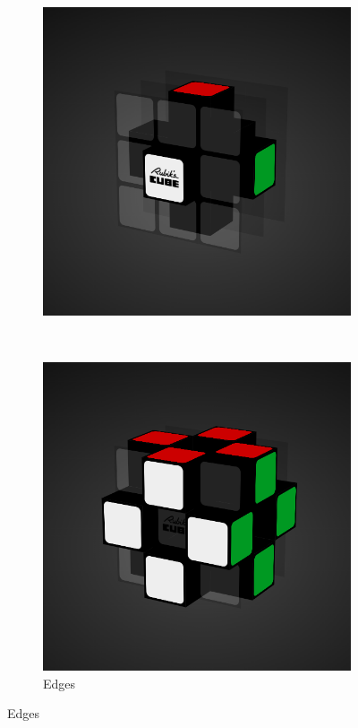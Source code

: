 \begin{figure}[h]
\begin{subfigure}{0.5\textwidth}
        \includegraphics[width=.90\linewidth]{Figures/2 Background/anatomy-centers.png}
    \end{subfigure}\\
    \vspace{2mm}
    \begin{subfigure}{0.5\textwidth}
        \centering
        \caption{Edges}
        \label{fig:anatomy-edges}
        \includegraphics[width=.90\linewidth]{Figures/2 Background/anatomy-edges.png}

\end{subfigure}
\end{figure}
